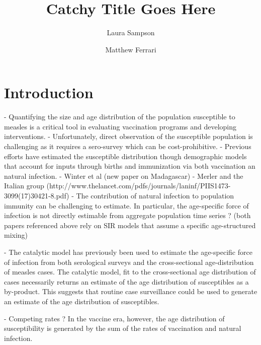 \documentclass[nofootinbib,aps,pre,twocolumn,superscriptaddress,showkeys,showpacs]{revtex4-1}
\begin{document}
\title{Catchy Title Goes Here}
\author{Laura Sampson}
\author{Matthew Ferrari}

\begin{abstract}


\end{abstract}
\maketitle

\section{Introduction \label{sec:Intro}}
- Quantifying the size and age distribution of the population susceptible to measles is a critical tool in evaluating vaccination programs and developing interventions.  
- Unfortunately, direct observation of the susceptible population is challenging as it requires a sero-survey which can be cost-prohibitive.
- Previous efforts have estimated the susceptible distribution though demographic models that account for inputs through births and immunization via both vaccination an natural infection.
	- Winter et al (new paper on Madagascar)
	- Merler and the Italian group (http://www.thelancet.com/pdfs/journals/laninf/PIIS1473-3099(17)30421-8.pdf)
- The contribution of natural infection to population immunity can be challenging to estimate. In particular, the age-specific force of infection is not directly estimable from aggregate population time series ? (both papers referenced above rely on SIR models that assume a specific age-structured mixing) 

- The catalytic model has previously been used to estimate the age-specific force of infection from both serological surveys and the cross-sectional age-distribution of measles cases.  The catalytic model, fit to the cross-sectional age distribution of cases necessarily returns an estimate of the age distribution of susceptibles as a by-product.  This suggests that routine case surveillance could be used to generate an estimate of the age distribution of susceptibles.  

- Competing rates ? 
In the vaccine era, however, the age distribution of susceptibility is generated by the sum of the rates of vaccination and natural infection. 
\end{document}
